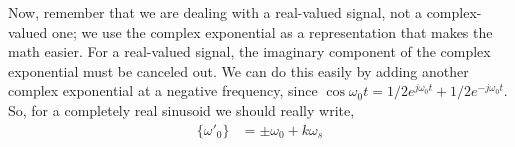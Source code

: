 %
% 
%

Now, remember that we are dealing with a real-valued signal, not a
complex-valued one; we use the complex exponential as a representation
that makes the math easier. For a real-valued signal, the imaginary
component of the complex exponential must be canceled out. We can do
this easily by adding another complex exponential at a negative
frequency, since $\cos \omega_0t = 1/2 e^{j\omega_0t} + 1/2
e^{-j\omega_0t}$. So, for a completely real sinusoid we should really write,
\begin{align}
\{\omega'_0\} &= \pm\omega_0 + k\omega_s
\label{eq:set-ambig-freq}
\end{align}

